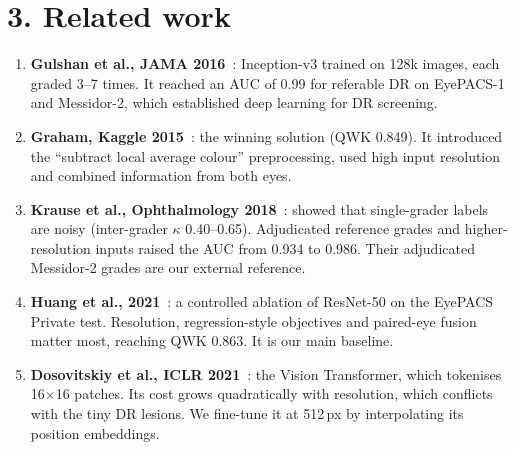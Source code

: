 \documentclass[10pt]{article}
\begin{document}
\section*{3. Related work}
\begin{enumerate}
\item \textbf{Gulshan et al., JAMA 2016}~\cite{gulshan}: Inception-v3 trained on 128k images, each graded 3--7 times. It reached an AUC of 0.99 for referable DR on EyePACS-1 and Messidor-2, which established deep learning for DR screening.
\item \textbf{Graham, Kaggle 2015}~\cite{graham}: the winning solution (QWK 0.849). It introduced the ``subtract local average colour'' preprocessing, used high input resolution and combined information from both eyes.
\item \textbf{Krause et al., Ophthalmology 2018}~\cite{krause}: showed that single-grader labels are noisy (inter-grader $\kappa$ 0.40--0.65). Adjudicated reference grades and higher-resolution inputs raised the AUC from 0.934 to 0.986. Their adjudicated Messidor-2 grades are our external reference.
\item \textbf{Huang et al., 2021}~\cite{huang}: a controlled ablation of ResNet-50 on the EyePACS Private test. Resolution, regression-style objectives and paired-eye fusion matter most, reaching QWK 0.863. It is our main baseline.
\item \textbf{Dosovitskiy et al., ICLR 2021}~\cite{vit}: the Vision Transformer, which tokenises 16$\times$16 patches. Its cost grows quadratically with resolution, which conflicts with the tiny DR lesions. We fine-tune it at 512\,px by interpolating its position embeddings.
\end{enumerate}
\end{document}

